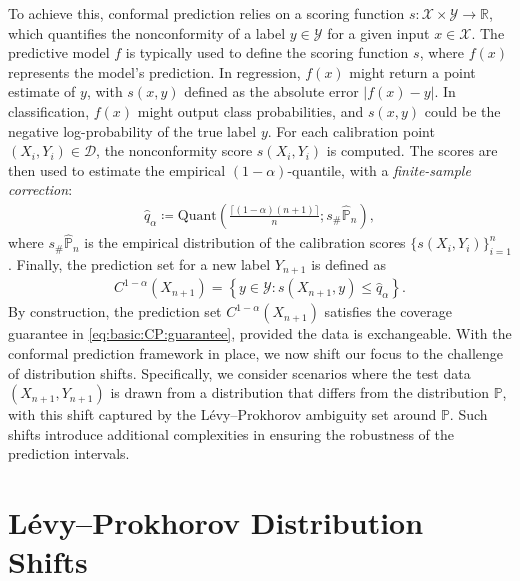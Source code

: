 \documentclass[11pt,a4paper]{article}
\begin{document}
To achieve this, conformal prediction relies on a scoring function $s: \mathcal{X} \times \mathcal{Y} \to \mathbb{R}$, which quantifies the nonconformity of a label $y \in \mathcal{Y}$ for a given input $x \in \mathcal{X}$. The predictive model $f$ is typically used to define the scoring function $s$, where $f(x)$ represents the model's prediction. In regression, $f(x)$ might return a point estimate of $y$, with $s(x, y)$ defined as the absolute error $|f(x) - y|$. In classification, $f(x)$ might output class probabilities, and $s(x, y)$ could be the negative log-probability of the true label $y$. For each calibration point $(X_i, Y_i) \in \mathcal{D}$, the nonconformity score $s(X_i, Y_i)$ is computed. The scores are then used to estimate the empirical $(1-\alpha)$-quantile, with a \emph{finite-sample correction}:
\begin{align*}
    \widehat{q}_\alpha \coloneqq \text{Quant}\left(\frac{\lceil (1-\alpha)(n+1) \rceil}{n}; s_\#{\widehat{\mathbb{P}}_n}\right),
\end{align*}
where $s_\#{\widehat{\mathbb{P}}_n}$ is the empirical distribution of the calibration scores $\{s(X_i, Y_i)\}_{i=1}^n$. Finally, the prediction set for a new label $Y_{n+1}$ is defined as
\begin{align*}
    C^{1-\alpha}(X_{n+1}) = \left\{y \in \mathcal{Y} : s(X_{n+1}, y) \leq \widehat{q}_\alpha \right\}.
\end{align*}
By construction, the prediction set $C^{1-\alpha}(X_{n+1})$ satisfies the coverage guarantee in \eqref{eq:basic:CP:guarantee}, provided the data is exchangeable. With the conformal prediction framework in place, we now shift our focus to the challenge of distribution shifts. Specifically, we consider scenarios where the test data $(X_{n+1}, Y_{n+1})$ is drawn from a distribution that differs from the distribution $\mathbb P$, with this shift captured by the Lévy–Prokhorov ambiguity set around $\mathbb P$. Such shifts introduce additional complexities in ensuring the robustness of the prediction intervals.











\section{Lévy–Prokhorov Distribution Shifts}
\label{sec:LP:shifts}
\end{document}
